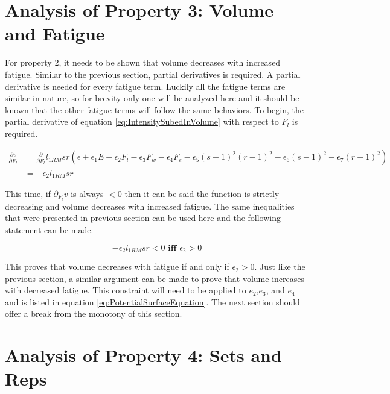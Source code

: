 \section{Analysis of Property 3: Volume and Fatigue}
\label{sec:PotentialSurfaceAnalysisOfProperty3}

For property 2, it needs to be shown that volume decreases with increased fatigue. Similar to the previous section, partial derivatives is required. A partial derivative is needed for every fatigue term. Luckily all the fatigue terms are similar in nature, so for brevity only one will be analyzed here and it should be known that the other fatigue terms will follow the same behaviors. To begin, the partial derivative of equation \ref{eq:IntensitySubedInVolume} with respect to $F_l$ is required.

\begin{equation*}
    \begin{split}
    		\frac{\partial v}{\partial F_l} & =
    		\frac{\partial}{\partial F_l} l_{1RM} sr\left( 
    			\epsilon+
    			\epsilon_1 E-
    			\epsilon_2 F_l-
    			\epsilon_3 F_w-
    			\epsilon_4 F_e-
    			\epsilon_5(s-1)^2(r-1)^2-
    			\epsilon_6(s-1)^2-
    			\epsilon_7(r-1)^2
    		\right) \\
    		& = -\epsilon_2 l_{1RM} sr
    \end{split}
\end{equation*}

This time, if $\partial_{F_l}v$ is always $<0$ then it can be said the function is strictly decreasing and volume decreases with increased fatigue. The same inequalities that were presented in previous section can be used here and the following statement can be made.

\begin{equation*}
    -\epsilon_2 l_{1RM} sr< 0 \textbf{ iff } \epsilon_2> 0
\end{equation*}

This proves that volume decreases with fatigue if and only if $\epsilon_2>0$. Just like the previous section, a similar argument can be made to prove that volume increases with decreased fatigue. This constraint will need to be applied to $e_2$,$e_3$, and $e_4$ and is listed in equation \ref{eq:PotentialSurfaceEquation}. The next section should offer a break from the monotony of this section.

\section{Analysis of Property 4: Sets and Reps}
\label{sec:PotentialSurfaceAnalysisOfProperty4}

